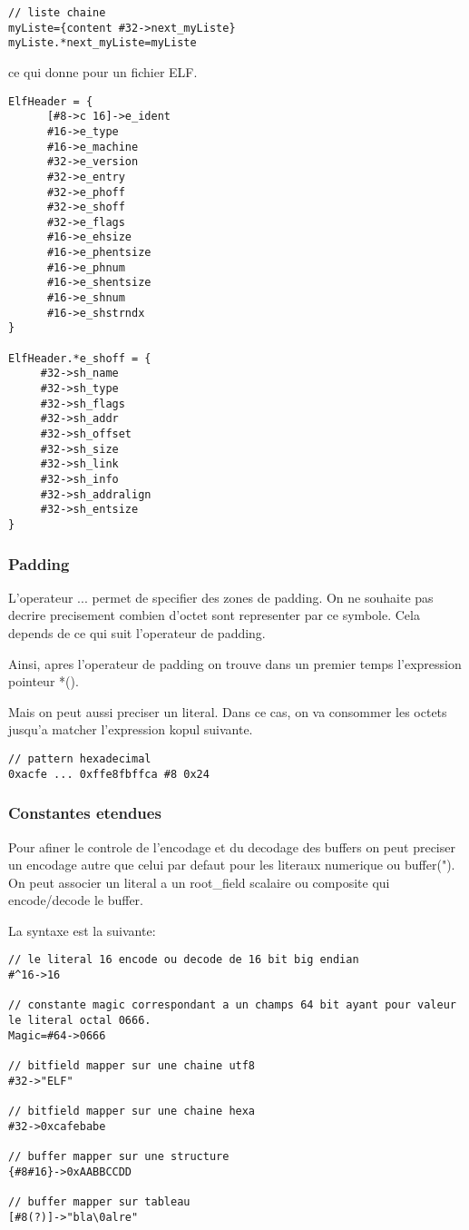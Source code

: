 \documentclass[11pt]{report}
\begin{document}
\begin{lstlisting}
// liste chaine
myListe={content #32->next_myListe}
myListe.*next_myListe=myListe
\end{lstlisting}

ce qui donne pour un fichier ELF.

\begin{lstlisting}
ElfHeader = {
	  [#8->c 16]->e_ident
	  #16->e_type
	  #16->e_machine
	  #32->e_version
	  #32->e_entry
	  #32->e_phoff
	  #32->e_shoff
	  #32->e_flags
	  #16->e_ehsize
	  #16->e_phentsize
	  #16->e_phnum
	  #16->e_shentsize
	  #16->e_shnum
	  #16->e_shstrndx
}

ElfHeader.*e_shoff = {
	 #32->sh_name
	 #32->sh_type
	 #32->sh_flags
	 #32->sh_addr
	 #32->sh_offset
	 #32->sh_size
	 #32->sh_link
	 #32->sh_info
	 #32->sh_addralign
	 #32->sh_entsize
}

\end{lstlisting}

\subsubsection{Padding}

L'operateur ... permet de specifier des zones de padding.
On ne souhaite pas decrire precisement combien d'octet sont representer par ce symbole.
Cela depends de ce qui suit l'operateur de padding.

Ainsi, apres l'operateur de padding on trouve dans un premier temps l'expression pointeur *().

Mais on peut aussi preciser un literal. Dans ce cas, on va consommer les octets jusqu'a matcher l'expression kopul
suivante.

\begin{lstlisting}
// pattern hexadecimal
0xacfe ... 0xffe8fbffca #8 0x24
\end{lstlisting}

\subsubsection{Constantes etendues}

Pour afiner le controle de l'encodage et du decodage des buffers on peut preciser un encodage autre que celui par defaut 
pour les literaux numerique ou buffer("). 
On peut associer un literal a un root\_field scalaire ou composite qui encode/decode le buffer.

La syntaxe est la suivante:

\begin{lstlisting}
// le literal 16 encode ou decode de 16 bit big endian
#^16->16

// constante magic correspondant a un champs 64 bit ayant pour valeur le literal octal 0666.
Magic=#64->0666

// bitfield mapper sur une chaine utf8
#32->"ELF"

// bitfield mapper sur une chaine hexa
#32->0xcafebabe

// buffer mapper sur une structure
{#8#16}->0xAABBCCDD

// buffer mapper sur tableau
[#8(?)]->"bla\0alre"
\end{lstlisting}
\end{document}
